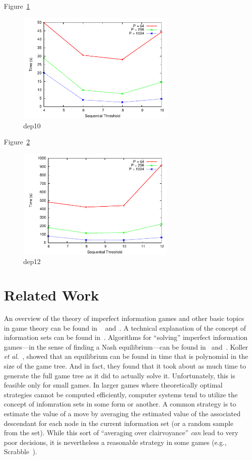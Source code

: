 \documentclass[11pt]{article}
\newcommand{\etal}{{\em et al.}\ }
\begin{document}
Figure~\ref{dep10}
\begin{figure}
\centering
\includegraphics[width=0.7\textwidth]{plots/dep10.pdf}
\caption{dep10}
\label{dep10}
\end{figure}
 
Figure~\ref{dep12}
\begin{figure}
\centering
\includegraphics[width=0.7\textwidth]{plots/dep12.pdf}
\caption{dep12}
\label{dep12}
\end{figure}
 

\section{Related Work}
An overview of the theory of imperfect information games and other basic topics in game theory can be found in
~\cite{kuhn03lectures} and~\cite{kuhn97classics}.  A technical explanation of the concept of information sets can be
found in~\cite{gilpin07algorithms}.  Algorithms for ``solving'' imperfect information games---in the sense of finding a
Nash equilibrium---can be found in~\cite{koller94fast} and~\cite{koller97representations}.  Koller \etal, showed that an
equilibrium can be found in time that is polynomial in the size of the game tree.  And in fact, they found that it took
about as much time to generate the full game tree as it did to actually solve it.  Unfortunately, this is feasible only
for small games.  In larger games where theoretically optimal strategies cannot be computed efficiently, computer
systems tend to utilize the concept of infomration sets in some form or another.  A common strategy is to estimate the
value of a move by averaging the estimated value of the associated descendant for each node in the current information
set (or a random sample from the set).  While this sort of ``averaging over clairvoyance'' {\em can} lead to very poor
decisions, it is nevertheless a reasonable strategy in some games (e.g., Scrabble~\cite{sheppard02world}).
\end{document}
